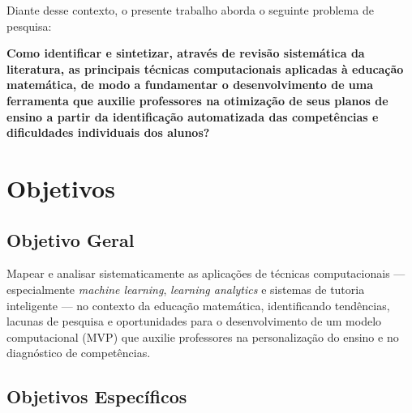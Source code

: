 Diante desse contexto, o presente trabalho aborda o seguinte problema de pesquisa:

\textbf{Como identificar e sintetizar, através de revisão sistemática da literatura, as principais técnicas computacionais aplicadas à educação matemática, de modo a fundamentar o desenvolvimento de uma ferramenta que auxilie professores na otimização de seus planos de ensino a partir da identificação automatizada das competências e dificuldades individuais dos alunos?}

\section{Objetivos}

\subsection{Objetivo Geral}
	
Mapear e analisar sistematicamente as aplicações de técnicas computacionais — especialmente \textit{machine learning}, \textit{learning analytics} e sistemas de tutoria inteligente — no contexto da educação matemática, identificando tendências, lacunas de pesquisa e oportunidades para o desenvolvimento de um modelo computacional (MVP) que auxilie professores na personalização do ensino e no diagnóstico de competências.

\subsection{Objetivos Específicos} 

